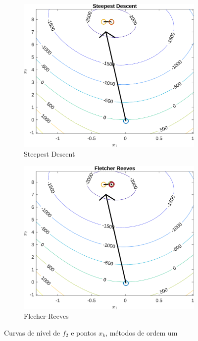 \documentclass[10pt, a4paper]{article}
\begin{document}
\begin{figure}[H]
      \centering
      \begin{subfigure}{0.45\textwidth}
            \centering
            \includegraphics[width=\textwidth]{img02_m03.png}
            \caption{Steepest Descent}
            \label{fig:graf02_m03}
      \end{subfigure}
      \begin{subfigure}{0.45\textwidth}
            \centering
            \includegraphics[width=\textwidth]{img02_m04.png}
            \caption{Flecher-Reeves}
            \label{fig:graf02_m04}
      \end{subfigure}
      \caption{Curvas de n\'ivel de $f_{2}$ e pontos $x_{k}$, m\'etodos de ordem um}
      \label{fig:graf02_ordem1}
\end{figure}
\end{document}
